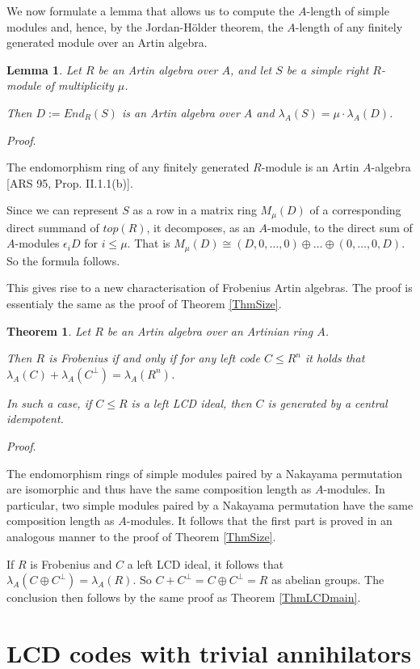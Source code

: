 \documentclass{article}
\theoremstyle{plain}
\newtheorem{Thm}[veta]{Theorem}
\newtheorem{Lemma}[veta]{Lemma}
\theoremstyle{plain}
\theoremstyle{remark}
\theoremstyle{plain}
\newenvironment{dukaz}{
  \par\medskip \noindent
  \textit{Proof}.
}{

\rightline{$\qedsymbol$}
}
\begin{document}
We now formulate a lemma that allows us to compute the $A$-length of simple modules and, hence, by the Jordan-Hölder theorem, the $A$-length of any finitely generated module over an Artin algebra. 
\begin{Lemma}\label{LemmaA-leng}
    Let $R$ be an Artin algebra over $A$, and let $S$ be a simple right $R$-module of multiplicity $\mu$.

    Then $D:=End_R(S)$ is an Artin algebra over $A$ and $\lambda_A(S)=\mu\cdot \lambda_A(D)$.
\end{Lemma}
\begin{dukaz}
The endomorphism ring of any finitely generated $R$-module is an Artin $A$-algebra [ARS 95, Prop. II.1.1(b)].   

Since we can represent $S$ as a row in a matrix ring $M_\mu(D)$ of a corresponding direct summand of $top(R)$, it decomposes, as an $A$-module, to the direct sum of $A$-modules $\epsilon_iD$ for $i\leq \mu$. That is $M_\mu(D)\cong (D, 0, \dots, 0) \oplus \dots \oplus (0,\dots, 0,D)$. So the formula follows.
\end{dukaz}
This gives rise to a new characterisation of Frobenius Artin algebras. The proof is essentialy the same as the proof of Theorem \ref{ThmSize}.
\begin{Thm}\label{ThmArtin}
    Let $R$ be an Artin algebra over an Artinian ring $A$.

    Then $R$ is Frobenius if and only if for any left code $C\leq R^n$ it holds that $\lambda_A(C)+\lambda_A(C^\perp)=\lambda_A(R^n)$.

    In such a case, if  $C\leq R$ is a left LCD ideal, then $C$ is generated by a central idempotent.
 \end{Thm}
 \begin{dukaz}
The endomorphism rings of simple modules paired by a Nakayama permutation are isomorphic and thus have the same composition length as $A$-modules. In particular, two simple modules paired by a Nakayama permutation have the same composition length as $A$-modules. It follows that the first part is proved in an analogous manner to the proof of Theorem \ref{ThmSize}.

If $R$ is Frobenius and $C$ a left LCD ideal, it follows that $\lambda_A(C\oplus C^\perp)=\lambda_A(R)$. So $C+C^\perp=C\oplus C^\perp=R$ as abelian groups. The conclusion then follows by the same proof as Theorem \ref{ThmLCDmain}.
 \end{dukaz}


\section{LCD codes with trivial annihilators}\label{Sectrivial}
\end{document}
